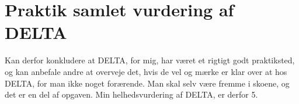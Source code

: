 \section{Praktik samlet vurdering af DELTA}
Kan derfor konkludere at DELTA, for mig, har været et rigtigt godt praktiksted, og kan anbefale andre at overveje det, hvis de vel og mærke er klar over at hos DELTA, for man ikke noget forærende. Man skal selv være fremme i skoene, og det er en del af opgaven.
Min helhedsvurdering af DELTA, er derfor 5.
